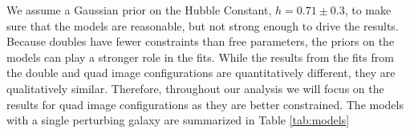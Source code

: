 We assume a Gaussian prior on the Hubble Constant, $h = 0.71 \pm 0.3$, to make sure that the models are reasonable, but not strong enough to drive the results. Because doubles have fewer constraints than free parameters, the priors on the models can play a stronger role in the fits. While the results from the fits from the double and quad image configurations are quantitatively different, they are qualitatively similar. Therefore, throughout our analysis we will focus on the results for quad image configurations as they are better constrained.  
The models with a single perturbing galaxy are summarized in Table \ref{tab:models}